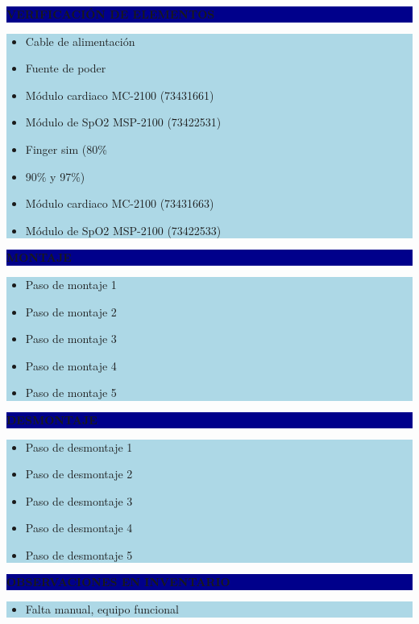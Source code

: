 \documentclass[11pt]{article}
\newcommand{\seccionbanda}[1]{%
  \vspace{0.6em}
  \noindent\colorbox{darkblue}{\parbox{\dimexpr\linewidth-2\fboxsep}{%
    \centering\color{white}\bfseries #1}}\par\vspace{0.6em}
}
\begin{document}
\newpage
\seccionbanda{VERIFICACIÓN DE ELEMENTOS}
\noindent\colorbox{lightblue}{\parbox{\dimexpr\linewidth-2\fboxsep\relax}{%
\begin{itemize}[label=$\square$, itemsep=4pt]
\item Cable de alimentación
\item Fuente de poder
\item Módulo cardiaco MC-2100 (73431661)
\item Módulo de SpO2 MSP-2100 (73422531)
\item Finger sim (80\%
\item 90\% y 97\%)
\item Módulo cardiaco MC-2100 (73431663)
\item Módulo de SpO2 MSP-2100 (73422533)
\end{itemize}
}}\par

\seccionbanda{MONTAJE}
\noindent\colorbox{lightblue}{\parbox{\dimexpr\linewidth-2\fboxsep\relax}{%
\begin{itemize}[label=$\square$, itemsep=4pt]
\item Paso de montaje 1
\item Paso de montaje 2
\item Paso de montaje 3
\item Paso de montaje 4
\item Paso de montaje 5
\end{itemize}
}}\par

\seccionbanda{DESMONTAJE}
\noindent\colorbox{lightblue}{\parbox{\dimexpr\linewidth-2\fboxsep\relax}{%
\begin{itemize}[label=$\square$, itemsep=4pt]
\item Paso de desmontaje 1
\item Paso de desmontaje 2
\item Paso de desmontaje 3
\item Paso de desmontaje 4
\item Paso de desmontaje 5
\end{itemize}
}}\par
\seccionbanda{OBSERVACIONES EN INVENTARIO}
\noindent\colorbox{lightblue}{\parbox{\dimexpr\linewidth-2\fboxsep\relax}{\begin{itemize}[itemsep=4pt]
\item Falta manual, equipo funcional
\end{itemize}}}\par
\end{document}
